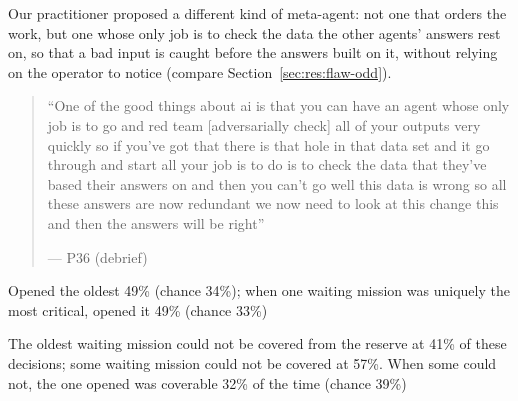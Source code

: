 \label{sec:qual:practitioner:pt-red-team}
{\color{blue}Our practitioner proposed a different kind of meta-agent: not one that orders the work, but one whose only job is to check the data the other agents' answers rest on, so that a bad input is caught before the answers built on it, without relying on the operator to notice (compare Section~\ref{sec:res:flaw-odd}).}

\begin{quote}\small
``One of the good things about ai is that you can have an agent whose only job is to go and red team [adversarially check] all of your outputs very quickly so if you've got that there is that hole in that data set and it go through and start all your job is to do is to check the data that they've based their answers on and then you can't go well this data is wrong so all these answers are now redundant we now need to look at this change this and then the answers will be right''\par\hfill--- P36 (debrief)
\end{quote}


Opened the oldest 49\% (chance 34\%); when one waiting mission was uniquely the most critical, opened it 49\% (chance 33\%)

The oldest waiting mission could not be covered from the reserve at 41\% of these decisions; some waiting mission could not be covered at 57\%. When some could not, the one opened was coverable 32\% of the time (chance 39\%)


\clearpage



